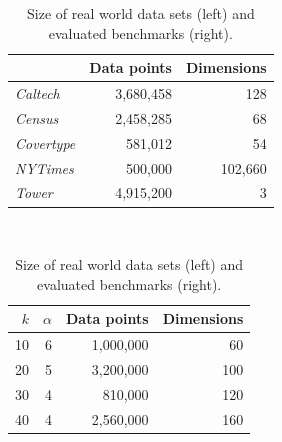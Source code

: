 \begin{center}
\begin{table}
\begin{minipage}{0.5\textwidth}
	\begin{tabular}{lrr}
		\toprule
        
		    & Data points
		    & Dimensions
            \\
		\midrule
		\textit{Caltech}
    		& 3,680,458
    		& 128
    		\\
		\textit{Census}
    		& 2,458,285
    		& 68
    		\\
	    \textit{Covertype}
    	    & 581,012
    		& 54
    		\\
	    \textit{NYTimes}
    	    & 500,000
    		& 102,660
    		\\
        \textit{Tower}
            & 4,915,200
    		& 3
    		\\
		\bottomrule
	\end{tabular}\\
\end{minipage}
\begin{minipage}{0.5\textwidth}
	\begin{tabular}{rrrr}
		\toprule
        $k$
		    & $\alpha$
		    & Data points
		    & Dimensions
            \\
		\midrule
        10
    		& 6
    		& 1,000,000
    		& 60
    		\\
        20
    		& 5
    		& 3,200,000
    		& 100
    		\\
        30
    		& 4
    		& 810,000
    		& 120
    		\\
        40
    		& 4
    		& 2,560,000
    		& 160
    		\\
		\bottomrule
	\end{tabular}\\
\end{minipage}
\caption{Size of real world data sets (left) and evaluated benchmarks (right).}
\label{tab:real-world-datasets-overview}
\end{table}
\end{center}
\vspace{-1.5cm}
